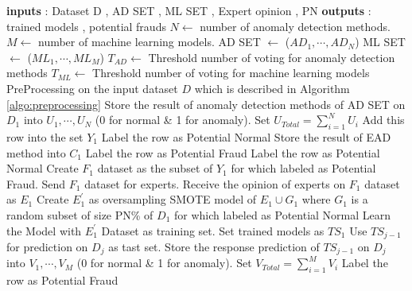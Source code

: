 \documentclass[12pt]{article}
\begin{document}
\begin{algorithm}[H]
    \caption{Multilayered structure of the SAD algorithm}\label{algo:multilayer}
    \begin{algorithmic}
        \STATE \textbf{inputs} : Dataset D , AD SET , ML SET , Expert opinion , PN
        \STATE \textbf{outputs}  : trained models , potential frauds
        \STATE $N \gets$ number of anomaly detection methods.
        \STATE $M \gets$ number of machine learning models.
        \STATE AD SET $\gets$ ($AD_1 , \cdots , AD_{N} $)
        \STATE ML SET  $\gets$ ($ML_1 , \cdots , ML_{M} $)
        \STATE $T_{AD} \gets$ Threshold number of voting for anomaly detection methods
        \STATE $T_{ML} \gets$ Threshold number of voting for machine learning models
        \STATE PreProcessing on the input dataset $D$ which is described in Algorithm \ref{algo:preprocessing}
        \STATE Store the result of anomaly detection methods of AD SET on $D_1$  into $U_{1} , \cdots , U_{N}$ (0 for normal \& 1 for anomaly).
        \STATE Set $U_{Total} = \sum_{i = 1}^{N}{U_{i}}$
        \STATE Add this row into the set $Y_1$
        \ELSE
        \STATE Label the row as Potential Normal
        \ENDIF
        \ENDFOR
        \STATE Store the result of EAD method into $C_1$
        \STATE Label the row as Potential Fraud
        \ELSE
        \STATE Label the row as Potential Normal
        \ENDIF
        \ENDFOR
        \STATE Create $F_1$ dataset as the subset of $Y_1$  for which labeled as Potential Fraud.
        \STATE Send $F_1$ dataset for experts.
        \STATE Receive the opinion of experts on $F_1$ dataset as $E_1$
        \STATE Create $E^\prime_1$ as oversampling SMOTE model of $E_1 \cup G_1$  where $G_1$ is a random subset of size PN\% of $D_1$ for which labeled as Potential Normal
        \STATE Learn the Model with $E^\prime_1$ Dataset as training set.
        \ENDFOR
        \STATE Set trained models as $TS_1$
        \STATE Use $TS_{j-1}$ for prediction on $D_j$ as tast set.
        \STATE Store the response prediction of  $TS_{j-1}$ on $D_j$  into $V_{1} , \cdots , V_{M}$ (0 for normal \& 1 for anomaly).
        \STATE Set $V_{Total} = \sum_{i = 1}^{M}{V_{i}}$
        \STATE Label the row as Potential Fraud
        \ELSE

\end{algorithmic}
\end{algorithm}
\end{document}
